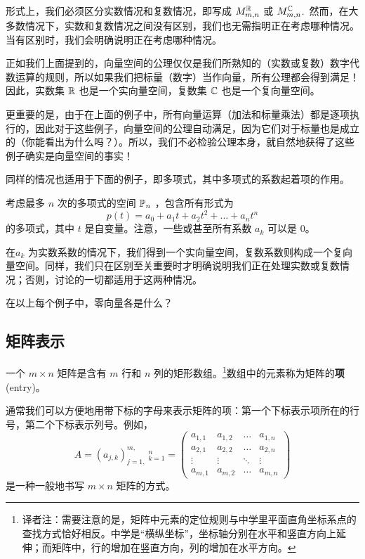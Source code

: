 形式上，我们必须区分实数情况和复数情况，即写成 $M^{\mathbb{R}}_{m,n}$ 或 $M^{\mathbb{C}}_{m,n}$.~然而，在大多数情况下，实数和复数情况之间没有区别，我们也无需指明正在考虑哪种情况。当有区别时，我们会明确说明正在考虑哪种情况。

\begin{remark*}
正如我们上面提到的，向量空间的公理仅仅是我们所熟知的（实数或复数）数字代数运算的规则，所以如果我们把标量（数字）当作向量，所有公理都会得到满足！因此，实数集 $\mathbb{R}$ 也是一个实向量空间，复数集 $\mathbb{C}$ 也是一个复向量空间。
\end{remark*}

更重要的是，由于在上面的例子中，所有向量运算（加法和标量乘法）都是逐项执行的，因此对于这些例子，向量空间的公理自动满足，因为它们对于标量也是成立的（你能看出为什么吗？）。所以，我们不必检验公理本身，就自然地获得了这些例子确实是向量空间的事实！

同样的情况也适用于下面的例子，即多项式，其中多项式的系数起着项的作用。

\begin{example*}
考虑最多 $n$ 次的多项式的空间 $\mathbb{P}_n$ ，包含所有形式为
$$p(t) = a_0 + a_1 t + a_2 t^2 + \dots + a_n t^n$$
的多项式，其中 $t$ 是自变量。注意，一些或甚至所有系数 $a_k$ 可以是 0。
\end{example*}

在$a_k$ 为实数系数的情况下，我们得到一个实向量空间，复数系数则构成一个复向量空间。同样，我们只在区别至关重要时才明确说明我们正在处理实数或复数情况；否则，讨论的一切都适用于这两种情况。

\begin{question*}
在以上每个例子中，零向量各是什么？
\end{question*}

\subsection{矩阵表示}\label{sec:01-01-02}
一个 $m \times n$ 矩阵是含有 $m$ 行和 $n$ 列的矩形数组。\footnote{
译者注：需要注意的是，矩阵中元素的定位规则与中学里平面直角坐标系点的查找方式恰好相反。中学是“横纵坐标”，坐标轴分别在水平和竖直方向上延伸；而矩阵中，行的增加在竖直方向，列的增加在水平方向。
}数组中的元素称为矩阵的\textbf{项}(entry)。  %


通常我们可以方便地用带下标的字母来表示矩阵的项：第一个下标表示项所在的行号，第二个下标表示列号。例如，
\begin{equation}\label{eq:01-01-01}
A = (a_{j,k})^{m,}_{j=1,}~^n_{k=1} = \begin{pmatrix}
a_{1,1} & a_{1,2} & \dots & a_{1,n} \\
a_{2,1} & a_{2,2} & \dots & a_{2,n} \\
\vdots & \vdots & \ddots & \vdots \\
a_{m,1} & a_{m,2} & \dots & a_{m,n}
\end{pmatrix}
\end{equation}
是一种一般地书写 $m \times n$ 矩阵的方式。

